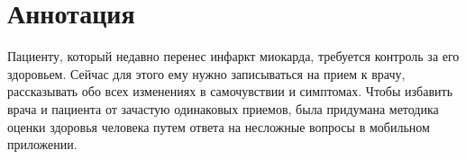 \section*{Аннотация}

Пациенту, который недавно перенес инфаркт миокарда, требуется контроль за его здоровьем.
Сейчас для этого ему нужно записываться на прием к врачу, рассказывать обо всех изменениях в самочувствии и симптомах.
Чтобы избавить врача и пациента от зачастую одинаковых приемов, была придумана методика оценки здоровья человека путем ответа на несложные вопросы в мобильном приложении.
